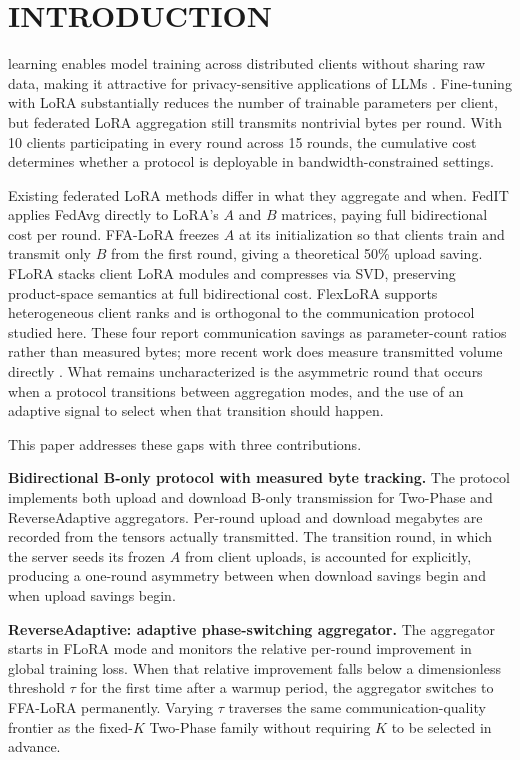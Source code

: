 \section{INTRODUCTION}
\label{sec:intro}

 learning enables model training across distributed clients without sharing raw data, making it attractive for privacy-sensitive applications of LLMs \cite{kairouz2021advances}. Fine-tuning with LoRA \cite{hu2022lora} substantially reduces the number of trainable parameters per client, but federated LoRA aggregation still transmits nontrivial bytes per round. With 10 clients participating in every round across 15 rounds, the cumulative cost determines whether a protocol is deployable in bandwidth-constrained settings.

Existing federated LoRA methods differ in what they aggregate and when. FedIT \cite{zhang2024federatedgpt} applies FedAvg \cite{mcmahan2017communication} directly to LoRA's $A$ and $B$ matrices, paying full bidirectional cost per round. FFA-LoRA \cite{sun2024ffalora} freezes $A$ at its initialization so that clients train and transmit only $B$ from the first round, giving a theoretical 50\% upload saving. FLoRA \cite{wang2024flora} stacks client LoRA modules and compresses via SVD, preserving product-space semantics at full bidirectional cost. FlexLoRA \cite{bai2024flexlora} supports heterogeneous client ranks and is orthogonal to the communication protocol studied here. These four report communication savings as parameter-count ratios rather than measured bytes; more recent work does measure transmitted volume directly \cite{yan2026fedsrd,ramesh2026florist}. What remains uncharacterized is the asymmetric round that occurs when a protocol transitions between aggregation modes, and the use of an adaptive signal to select when that transition should happen.

This paper addresses these gaps with three contributions.

\textbf{Bidirectional B-only protocol with measured byte tracking.}
The protocol implements both upload and download B-only transmission for Two-Phase and ReverseAdaptive aggregators. Per-round upload and download megabytes are recorded from the tensors actually transmitted. The transition round, in which the server seeds its frozen $A$ from client uploads, is accounted for explicitly, producing a one-round asymmetry between when download savings begin and when upload savings begin.

\textbf{ReverseAdaptive: adaptive phase-switching aggregator.}
The aggregator starts in FLoRA mode and monitors the relative per-round improvement in global training loss. When that relative improvement falls below a dimensionless threshold $\tau$ for the first time after a warmup period, the aggregator switches to FFA-LoRA permanently. Varying $\tau$ traverses the same communication-quality frontier as the fixed-$K$ Two-Phase family without requiring $K$ to be selected in advance.


